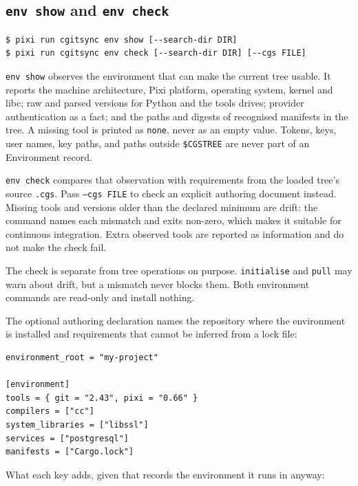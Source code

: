 \subsection{\texttt{env show} and \texttt{env check}}

\begin{lstlisting}[language=bash]
$ pixi run cgitsync env show [--search-dir DIR]
$ pixi run cgitsync env check [--search-dir DIR] [--cgs FILE]
\end{lstlisting}

\texttt{env show} observes the environment that can make the current tree usable.
It reports the machine architecture, Pixi platform, operating system, kernel
and libc; raw and parsed versions for Python and the tools \cgspkg{} drives;
provider authentication as a fact; and the paths and digests of recognised
manifests in the tree. A missing tool is printed as \texttt{none}, never as
an empty value. Tokens, keys, user names, key paths, and paths outside
\texttt{\$CGSTREE} are never part of an Environment record.

\texttt{env check} compares that observation with requirements from the
loaded tree's source \texttt{.cgs}. Pass \texttt{--cgs FILE} to check an
explicit authoring document instead. Missing tools and versions older than
the declared minimum are drift: the command names each mismatch and exits
non-zero, which makes it suitable for continuous integration. Extra observed
tools are reported as information and do not make the check fail.

The check is separate from tree operations on purpose. \texttt{initialise}
and \texttt{pull} may warn about drift, but a mismatch never blocks them.
Both environment commands are read-only and install nothing.

The optional authoring declaration names the repository where the environment
is installed and requirements that cannot be inferred from a lock file:

\begin{lstlisting}
environment_root = "my-project"

[environment]
tools = { git = "2.43", pixi = "0.66" }
compilers = ["cc"]
system_libraries = ["libssl"]
services = ["postgresql"]
manifests = ["Cargo.lock"]
\end{lstlisting}

What each key adds, given that \cgspkg{} records the environment it runs in
anyway:

